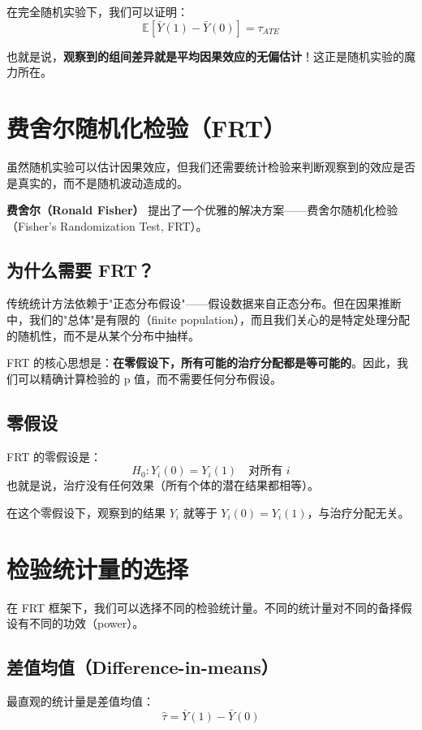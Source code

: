 在完全随机实验下，我们可以证明：
\[
\mathbb{E}[\bar{Y}(1) - \bar{Y}(0)] = \tau_{ATE}
\]

也就是说，\textbf{观察到的组间差异就是平均因果效应的无偏估计}！这正是随机实验的魔力所在。

\section{费舍尔随机化检验（FRT）}

虽然随机实验可以估计因果效应，但我们还需要统计检验来判断观察到的效应是否是真实的，而不是随机波动造成的。

\textbf{费舍尔（Ronald Fisher）} 提出了一个优雅的解决方案——费舍尔随机化检验（Fisher's Randomization Test, FRT）。

\subsection{为什么需要 FRT？}

传统统计方法依赖于"正态分布假设"——假设数据来自正态分布。但在因果推断中，我们的"总体"是有限的（finite population），而且我们关心的是特定处理分配的随机性，而不是从某个分布中抽样。

FRT 的核心思想是：\textbf{在零假设下，所有可能的治疗分配都是等可能的}。因此，我们可以精确计算检验的 p 值，而不需要任何分布假设。

\subsection{零假设}

FRT 的零假设是：
\[
H_0: Y_i(0) = Y_i(1) \quad \text{对所有 } i
\]
也就是说，治疗没有任何效果（所有个体的潜在结果都相等）。

在这个零假设下，观察到的结果 $Y_i$ 就等于 $Y_i(0) = Y_i(1)$，与治疗分配无关。

\section{检验统计量的选择}

在 FRT 框架下，我们可以选择不同的检验统计量。不同的统计量对不同的备择假设有不同的功效（power）。

\subsection{差值均值（Difference-in-means）}

最直观的统计量是差值均值：
\[
\hat{\tau} = \bar{Y}(1) - \bar{Y}(0)
\]

